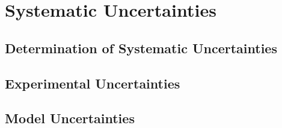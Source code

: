 \chapter{Systematic Uncertainties}

\section{Determination of Systematic Uncertainties}

\section{Experimental Uncertainties}

\section{Model Uncertainties}


